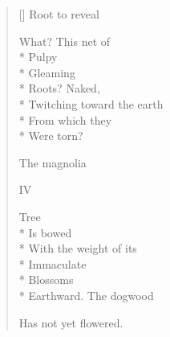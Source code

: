 \begin{verse}[\versewidth]
Root           to reveal

What?         This net of\\*
Pulpy\\*
Gleaming\\*
Roots?  Naked,\\*
Twitching toward the earth\\*
From which they\\*
Were torn?

The magnolia 

 \qquad IV

Tree\\*
Is bowed\\*
With the weight of its\\*
Immaculate\\*
Blossoms\\*
Earthward.                      The dogwood

Has not yet flowered.
\end{verse}
